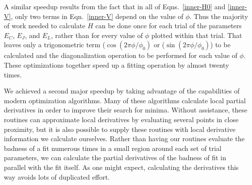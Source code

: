 \documentclass[twocolumn]{revtex4}
\begin{document}
A similar speedup results from the fact that in all of
Eqns.~\ref{inner-H0} and \ref{inner-V}, only two terms in
Eqn.~\ref{inner-V} depend on the value of $\phi$. Thus the majority of
work needed to calculate $H$ can be done once for each trial of the
parameters $E_C$, $E_J$, and $E_L$, rather than for every value of
$\phi$ plotted within that trial. That leaves only a trigonometric
term ($\cos\left(2\pi\phi/\phi_0\right)$ or
($\sin\left(2\pi\phi/\phi_0\right)$) to be calculated and the
diagonalization operation to be performed for each value of
$\phi$. These optimizations together speed up a fitting operation by
almost twenty times.

We achieved a second major speedup by taking advantage of the
capabilities of modern optimization algorithms.\cite{Byrd}\cite{Zhu}
Many of these algorithms calculate local partial derivatives in order
to improve their search for minima. Without assistance, these routines
can approximate local derivatives by evaluating several points in
close proximity, but it is also possible to supply these routines with
local derivative information we calculate ourselves. Rather than
having our routines evaluate the badness of a fit numerous times in a
small region around each set of trial parameters, we can calculate the
partial derivatives of the badness of fit in parallel with the fit
itself. As one might expect, calculating the derivatives this way
avoids lots of duplicated effort.
\end{document}
